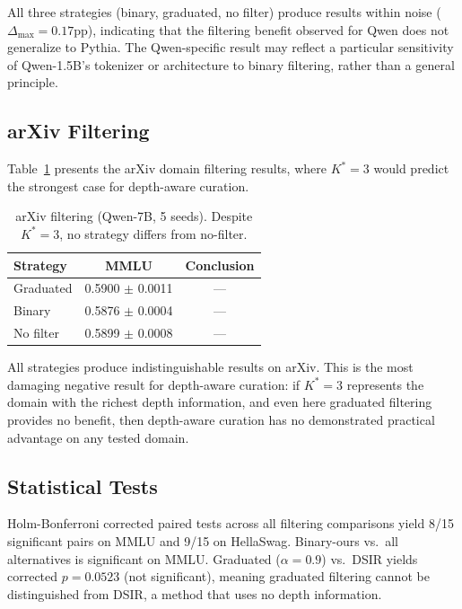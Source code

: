 \documentclass[11pt]{article}
\newcommand{\kstar}{K^*}
\begin{document}
All three strategies (binary, graduated, no filter) produce results within noise ($\Delta_{\max} = 0.17$pp), indicating that the filtering benefit observed for Qwen does not generalize to Pythia. The Qwen-specific result may reflect a particular sensitivity of Qwen-1.5B's tokenizer or architecture to binary filtering, rather than a general principle.

\subsection{arXiv Filtering}

Table~\ref{tab:arxiv_filter} presents the arXiv domain filtering results, where $\kstar{=}3$ would predict the strongest case for depth-aware curation.

\begin{table}[t]
\centering
\caption{arXiv filtering (Qwen-7B, 5 seeds). Despite $\kstar{=}3$, no strategy differs from no-filter.}
\label{tab:arxiv_filter}
\small
\begin{tabular}{lcc}
\toprule
Strategy & MMLU & Conclusion \\
\midrule
Graduated & 0.5900 $\pm$ 0.0011 & --- \\
Binary & 0.5876 $\pm$ 0.0004 & --- \\
No filter & 0.5899 $\pm$ 0.0008 & --- \\
\bottomrule
\end{tabular}
\end{table}

All strategies produce indistinguishable results on arXiv. This is the most damaging negative result for depth-aware curation: if $\kstar{=}3$ represents the domain with the richest depth information, and even here graduated filtering provides no benefit, then depth-aware curation has no demonstrated practical advantage on any tested domain.


\subsection{Statistical Tests}
\label{sec:stats}

Holm-Bonferroni corrected paired tests across all filtering comparisons yield 8/15 significant pairs on MMLU and 9/15 on HellaSwag. Binary-ours vs.\ all alternatives is significant on MMLU. Graduated ($\alpha{=}0.9$) vs.\ DSIR yields corrected $p = 0.0523$ (not significant), meaning graduated filtering cannot be distinguished from DSIR, a method that uses no depth information.
\end{document}
